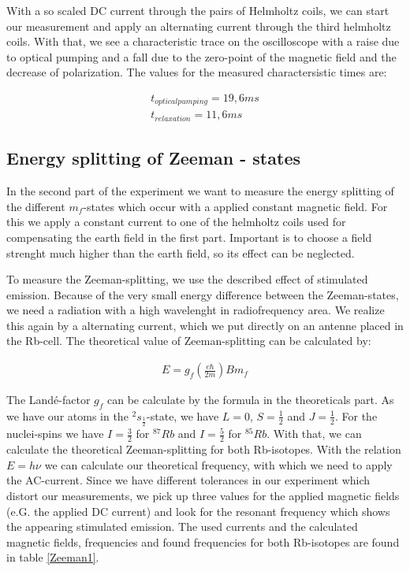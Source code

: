With a so scaled DC current through the pairs of Helmholtz coils, we can start our measurement and apply an alternating current through the third helmholtz coils. With that, we see a characteristic trace on the oscilloscope with a raise due to optical pumping and a fall due to the zero-point of the magnetic field and the decrease of polarization. The values for the measured charactersistic times are:

\begin{align}
t_{optical pumping} = 19,6 ms \\
t_{relaxation} = 11,6 ms
\end{align}

\subsection{Energy splitting of Zeeman - states}

In the second part of the experiment we want to measure the energy splitting of the  different $m_f$-states which occur with a applied constant magnetic field. For this we apply a constant current to one of the helmholtz coils used for compensating the earth field in the first part. Important is to choose a field strenght much higher than the earth field, so its effect can be neglected.

To measure the Zeeman-splitting, we use the described effect of stimulated emission. Because of the very small energy difference between the Zeeman-states, we need a radiation with a high wavelenght in radiofrequency area. We realize this again by a alternating current, which we put directly on an antenne placed in the Rb-cell. The theoretical value of Zeeman-splitting can be calculated by:

\begin{align}
E = g_f\left(\frac{e\hbar}{2m}\right)Bm_f
\end{align}

The Landé-factor $g_f$ can be calculate by the formula in the theoreticals part. As we have our atoms in the $^{2}s_{\frac{1}{2}}$-state, we have $L=0$, $S=\frac{1}{2}$ and $J=\frac{1}{2}$. For the nuclei-spins we have $I=\frac{3}{2}$ for $^{87}Rb$ and $I=\frac{5}{2}$ for $^{85}Rb$. With that, we can calculate the theoretical Zeeman-splitting for both Rb-isotopes. With the relation $E=h\nu$ we can calculate our theoretical frequency, with which we need to apply the AC-current. Since we have different tolerances in our experiment which distort our measurements, we pick up three values for the applied magnetic fields (e.G. the applied DC current) and look for the resonant frequency which shows the appearing stimulated emission. The used currents and the calculated magnetic fields, frequencies and found frequencies for both Rb-isotopes are found in table \ref{Zeeman1}.

